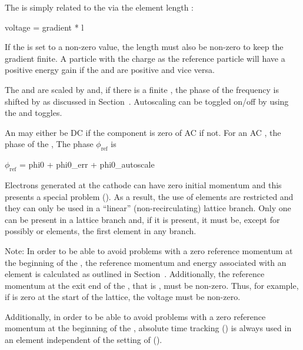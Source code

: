 The  is simply related to the  via the element length :
\begin{example}
  voltage = gradient * l
\end{example}
If the  is set to a non-zero value, the length  must also be non-zero to
keep the gradient finite.  A particle with the charge as the reference particle will have
a positive energy gain if the  and  are positive and vice versa.

The  and  are scaled by  and, if there is a
finite , the phase of the frequency is shifted by  as
discussed in Section~. Autoscaling can be toggled on/off by using the
 and  toggles.

An  may either be DC if the  component is zero of AC if
not. For an AC , the phase of the , The phase $\phi_{\text{ref}}$
is 
\begin{example} 
  \(\phi_{\text{ref}}\) = phi0 + phi0_err + phi0_autoscale 
\end{example}

Electrons generated at the cathode can have zero initial momentum and
this presents a special problem (). As a result, the
use of  elements are restricted and they can only be used in
a ``linear'' (non-recirculating) lattice branch. Only one 
can be present in a lattice branch and, if it is present, it must be,
except for possibly  or  elements, the first
element in any branch.
 
Note: In order to be able to avoid problems with a zero reference
momentum at the beginning of the , the reference momentum
and energy associated with an  element is calculated as
outlined in Section~. Additionally, the reference
momentum at the exit end of the , that is , must be
non-zero. Thus, for example, if  is zero at the start of the
lattice, the  voltage must be non-zero. 

Additionally, in order to be able to avoid problems with a zero reference momentum at the
beginning of the , absolute time tracking () is always used in
an  element independent of the setting of 
().


